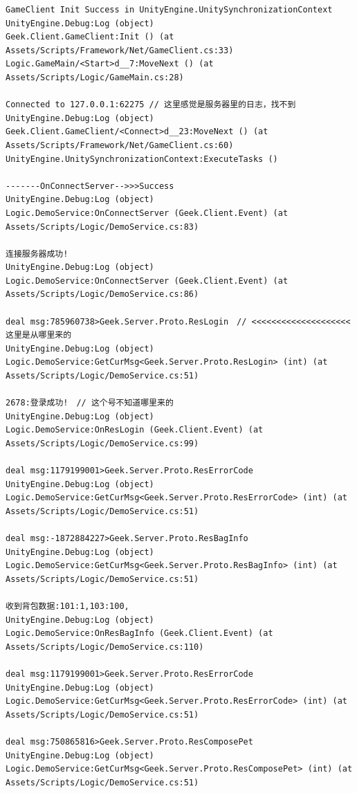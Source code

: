 \documentclass[9pt, b5paper]{article}
\begin{document}
\begin{verbatim}
GameClient Init Success in UnityEngine.UnitySynchronizationContext
UnityEngine.Debug:Log (object)
Geek.Client.GameClient:Init () (at Assets/Scripts/Framework/Net/GameClient.cs:33)
Logic.GameMain/<Start>d__7:MoveNext () (at Assets/Scripts/Logic/GameMain.cs:28)

Connected to 127.0.0.1:62275 // 这里感觉是服务器里的日志，找不到
UnityEngine.Debug:Log (object)
Geek.Client.GameClient/<Connect>d__23:MoveNext () (at Assets/Scripts/Framework/Net/GameClient.cs:60)
UnityEngine.UnitySynchronizationContext:ExecuteTasks ()

-------OnConnectServer-->>>Success
UnityEngine.Debug:Log (object)
Logic.DemoService:OnConnectServer (Geek.Client.Event) (at Assets/Scripts/Logic/DemoService.cs:83)

连接服务器成功!
UnityEngine.Debug:Log (object)
Logic.DemoService:OnConnectServer (Geek.Client.Event) (at Assets/Scripts/Logic/DemoService.cs:86)

deal msg:785960738>Geek.Server.Proto.ResLogin　// <<<<<<<<<<<<<<<<<<<< 这里是从哪里来的 　
UnityEngine.Debug:Log (object)
Logic.DemoService:GetCurMsg<Geek.Server.Proto.ResLogin> (int) (at Assets/Scripts/Logic/DemoService.cs:51)

2678:登录成功!　// 这个号不知道哪里来的
UnityEngine.Debug:Log (object)
Logic.DemoService:OnResLogin (Geek.Client.Event) (at Assets/Scripts/Logic/DemoService.cs:99)

deal msg:1179199001>Geek.Server.Proto.ResErrorCode
UnityEngine.Debug:Log (object)
Logic.DemoService:GetCurMsg<Geek.Server.Proto.ResErrorCode> (int) (at Assets/Scripts/Logic/DemoService.cs:51)

deal msg:-1872884227>Geek.Server.Proto.ResBagInfo
UnityEngine.Debug:Log (object)
Logic.DemoService:GetCurMsg<Geek.Server.Proto.ResBagInfo> (int) (at Assets/Scripts/Logic/DemoService.cs:51)

收到背包数据:101:1,103:100,
UnityEngine.Debug:Log (object)
Logic.DemoService:OnResBagInfo (Geek.Client.Event) (at Assets/Scripts/Logic/DemoService.cs:110)

deal msg:1179199001>Geek.Server.Proto.ResErrorCode
UnityEngine.Debug:Log (object)
Logic.DemoService:GetCurMsg<Geek.Server.Proto.ResErrorCode> (int) (at Assets/Scripts/Logic/DemoService.cs:51)

deal msg:750865816>Geek.Server.Proto.ResComposePet
UnityEngine.Debug:Log (object)
Logic.DemoService:GetCurMsg<Geek.Server.Proto.ResComposePet> (int) (at Assets/Scripts/Logic/DemoService.cs:51)


\end{verbatim}
\end{document}
